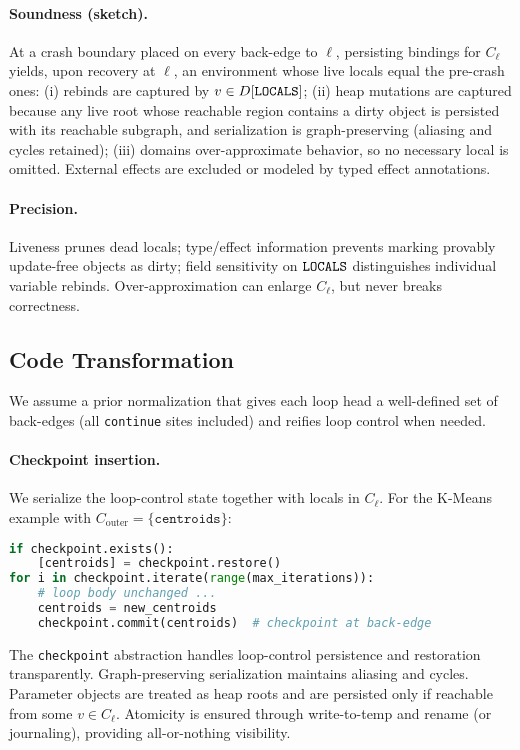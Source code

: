 \paragraph{Soundness (sketch).}
At a crash boundary placed on every back-edge to $\ell$, persisting bindings for $C_\ell$ yields, upon recovery at $\ell$, an environment whose live locals equal the pre-crash ones:
(i) rebinds are captured by $v\in D[\texttt{LOCALS}]$; (ii) heap mutations are captured because any live root whose reachable region contains a dirty object is persisted with its reachable subgraph, and serialization is graph-preserving (aliasing and cycles retained); (iii) domains over-approximate behavior, so no necessary local is omitted. External effects are excluded or modeled by typed effect annotations.

\paragraph{Precision.}
Liveness prunes dead locals; type/effect information prevents marking provably update-free objects as dirty; field sensitivity on $\texttt{LOCALS}$ distinguishes individual variable rebinds. Over-approximation can enlarge $C_\ell$, but never breaks correctness.

\subsection{Code Transformation}

We assume a prior normalization that gives each loop head a well-defined set of back-edges (all \texttt{continue} sites included) and reifies loop control when needed.

\paragraph{Checkpoint insertion.}
We serialize the loop-control state together with locals in $C_\ell$. For the K-Means example with $C_\text{outer} = \{\texttt{centroids}\}$:
\begin{lstlisting}[language=Python]
if checkpoint.exists():
    [centroids] = checkpoint.restore()
for i in checkpoint.iterate(range(max_iterations)):
    # loop body unchanged ...
    centroids = new_centroids
    checkpoint.commit(centroids)  # checkpoint at back-edge
\end{lstlisting}

The \texttt{checkpoint} abstraction handles loop-control persistence and restoration transparently. Graph-preserving serialization maintains aliasing and cycles. Parameter objects are treated as heap roots and are persisted only if reachable from some $v\in C_\ell$. Atomicity is ensured through write-to-temp and rename (or journaling), providing all-or-nothing visibility.

